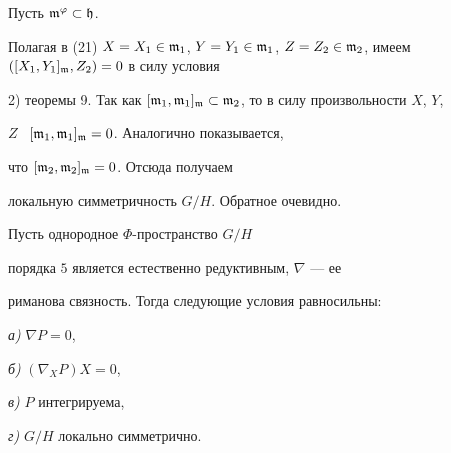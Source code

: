 \begin{pf}


Пусть $\frak{m}^\varphi \subset \frak{h}$.


Полагая в (21) $X=X_1\in \frak{m}_1$, $Y=Y_1\in \frak{m}_1$, $Z=Z_2\in


\frak{m}_2$, имеем $([X_1,Y_1]_{\frak{m}},Z_2)=0$ в силу условия


2) теоремы 9. Так как $[\frak{m}_1,\frak{m}_1]_{\frak{m}}\subset


\frak{m}_2$, то в силу произвольности $X$, $Y$,


$Z$ \ $[\frak{m}_1,\frak{m}_1]_{\frak{m}}=0$. Аналогично показывается,


что $[\frak{m}_2,\frak{m}_2]_{\frak{m}}=0$. Отсюда получаем


локальную симметричность $G/H$. Обратное очевидно.


\end{pf}





\begin{thm}


Пусть однородное $\Phi$-пространство $G/H$


порядка $5$ является естественно редуктивным, $\nabla$ --- ее


риманова связность. Тогда следующие условия равносильны\/$:$





{\em а)} $\nabla P =0$,





{\em б)} $(\nabla_XP)X=0$,





{\em в)} $P$ интегрируема,





{\em г)} $G/H$ локально симметрично.


\end{thm}






